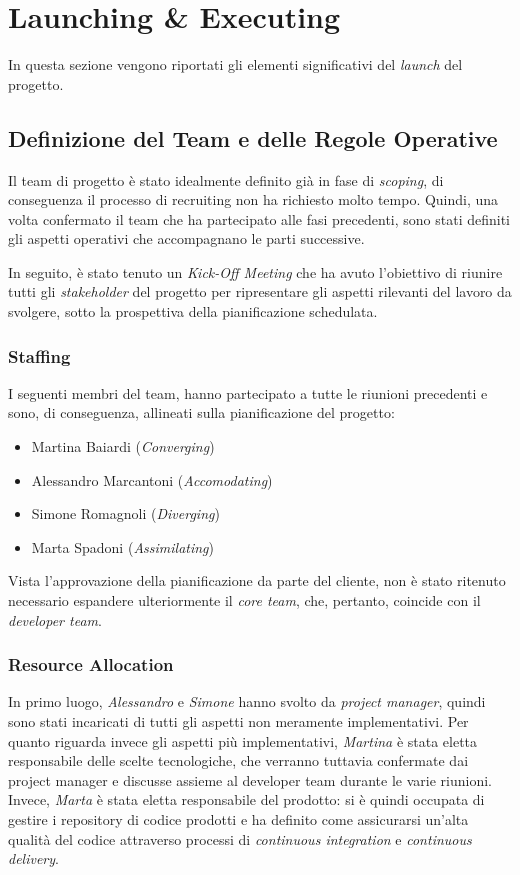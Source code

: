 \section{Launching \& Executing}
\label{sec:launching}

In questa sezione vengono riportati gli elementi significativi del \textit{launch} del progetto.

\subsection{Definizione del Team e delle Regole Operative}

Il team di progetto è stato idealmente definito già in fase di \textit{scoping}, di conseguenza il processo di recruiting non ha richiesto molto tempo. Quindi, una volta confermato il team che ha partecipato alle fasi precedenti, sono stati definiti gli aspetti operativi che accompagnano le parti successive.

In seguito, è stato tenuto un \textit{Kick-Off Meeting} che ha avuto l'obiettivo di riunire tutti gli \textit{stakeholder} del progetto per ripresentare gli aspetti rilevanti del lavoro da svolgere, sotto la prospettiva della pianificazione schedulata.

\subsubsection{Staffing}
I seguenti membri del team, hanno partecipato a tutte le riunioni precedenti e sono, di conseguenza, allineati sulla pianificazione del progetto:
\begin{itemize}
    \item Martina Baiardi (\textit{Converging})
    \item Alessandro Marcantoni (\textit{Accomodating})
    \item Simone Romagnoli (\textit{Diverging})
    \item Marta Spadoni (\textit{Assimilating})
\end{itemize}
Vista l'approvazione della pianificazione da parte del cliente, non è stato ritenuto necessario espandere ulteriormente il \textit{core team}, che, pertanto, coincide con il \textit{developer team}.

\subsubsection{Resource Allocation}
In primo luogo, \textit{Alessandro} e \textit{Simone} hanno svolto da \textit{project manager}, quindi sono stati incaricati di tutti gli aspetti non meramente implementativi.
Per quanto riguarda invece gli aspetti più implementativi, \textit{Martina} è stata eletta responsabile delle scelte tecnologiche, che verranno tuttavia confermate dai project manager e discusse assieme al developer team durante le varie riunioni. Invece, \textit{Marta} è stata eletta responsabile del prodotto: si è quindi occupata di gestire i repository di codice prodotti e ha definito come assicurarsi un'alta qualità del codice attraverso processi di \textit{continuous integration} e \textit{continuous delivery}.

